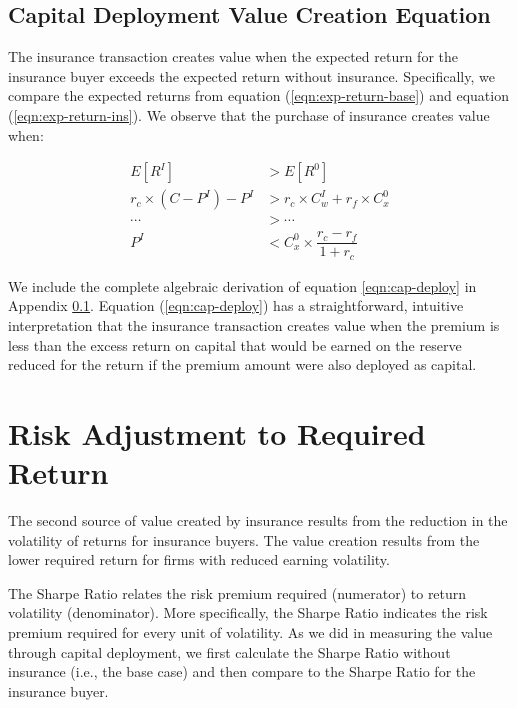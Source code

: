 \documentclass[
]{article}
\begin{document}
\hypertarget{capital-deployment-value-creation-equation}{%
\subsection{Capital Deployment Value Creation
Equation}\label{capital-deployment-value-creation-equation}}

The insurance transaction creates value when the expected return for the
insurance buyer exceeds the expected return without insurance.
Specifically, we compare the expected returns from equation
(\ref{eqn:exp-return-base}) and equation (\ref{eqn:exp-return-ins}). We
observe that the purchase of insurance creates value when:

\begin{align}
\nonumber E[R^I] &> E[R^0] \\
\nonumber r_c \times (C - P^{I}) - P^{I} &> r_c \times C_{w}^{I} + r_f \times C_{x}^{0} \\
\cdots &> \cdots\\
P^{I} &< C_{x}^{0} \times \dfrac{r_c - r_f}{1 + r_c} \label{eqn:cap-deploy}
\end{align}

We include the complete algebraic derivation of equation
\ref{eqn:cap-deploy} in Appendix
\ref{capital-deployment-value-creation-equation}. Equation
(\ref{eqn:cap-deploy}) has a straightforward, intuitive interpretation
that the insurance transaction creates value when the premium is less
than the excess return on capital that would be earned on the reserve
reduced for the return if the premium amount were also deployed as
capital.

\hypertarget{risk-adjustment-to-required-return}{%
\section{Risk Adjustment to Required
Return}\label{risk-adjustment-to-required-return}}

The second source of value created by insurance results from the
reduction in the volatility of returns for insurance buyers. The value
creation results from the lower required return for firms with reduced
earning volatility.

The Sharpe Ratio relates the risk premium required (numerator) to return
volatility (denominator). More specifically, the Sharpe Ratio indicates
the risk premium required for every unit of volatility. As we did in
measuring the value through capital deployment, we first calculate the
Sharpe Ratio without insurance (i.e., the base case) and then compare to
the Sharpe Ratio for the insurance buyer.
\end{document}
